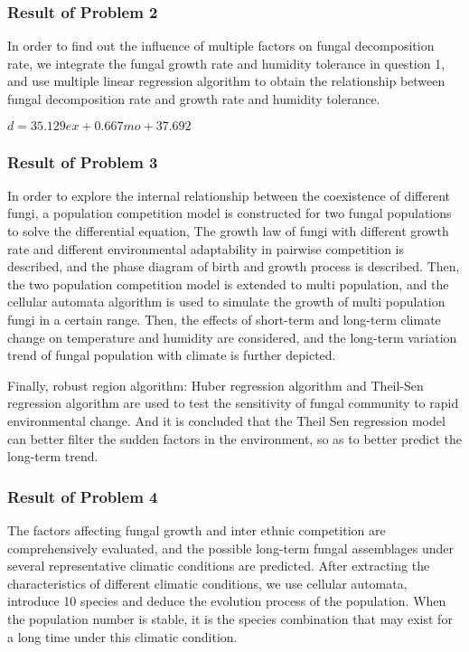 \documentclass{mcmthesis}
\begin{document}
\subsubsection{Result of Problem 2}

In order to find out the influence of multiple factors on fungal decomposition rate, we integrate the fungal growth rate and humidity tolerance in question 1, and use multiple linear regression algorithm to obtain the relationship between fungal decomposition rate and growth rate and humidity tolerance.

$ d = 35.129ex +0.667mo + 37.692 $

\subsubsection{Result of Problem 3}

In order to explore the internal relationship between the coexistence of different fungi, a population competition model is constructed for two fungal populations to solve the differential equation, The growth law of fungi with different growth rate and different environmental adaptability in pairwise competition is described, and the phase diagram of birth and growth process is described. Then, the two population competition model is extended to multi population, and the cellular automata algorithm is used to simulate the growth of multi population fungi in a certain range. Then, the effects of short-term and long-term climate change on temperature and humidity are considered, and the long-term variation trend of fungal population with climate is further depicted.

Finally, robust region algorithm: Huber regression algorithm and Theil-Sen regression algorithm are used to test the sensitivity of fungal community to rapid environmental change. And it is concluded that the Theil Sen regression model can better filter the sudden factors in the environment, so as to better predict the long-term trend.

\subsubsection{Result of Problem 4}

The factors affecting fungal growth and inter ethnic competition are comprehensively evaluated, and the possible long-term fungal assemblages under several representative climatic conditions are predicted. After extracting the characteristics of different climatic conditions, we use cellular automata, introduce 10 species and deduce the evolution process of the population. When the population number is stable, it is the species combination that may exist for a long time under this climatic condition.
\end{document}
